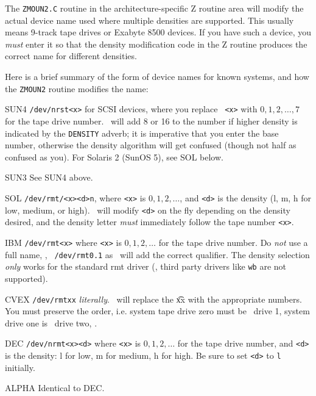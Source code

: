 The {\tt ZMOUN2.C} routine in the architecture-specific Z routine area will
modify the actual device name used where multiple densities are supported.
This usually means 9-track tape drives or Exabyte 8500 devices.  If you
have such a device, you {\it must\/} enter it so that the density
modification code in the Z routine produces the correct name for different
densities.

Here is a brief summary of the form of device names for known systems, and
how the {\tt ZMOUN2} routine modifies the name:
\medskip
{\parindent 2cm
\item{SUN4} {\tt /dev/nrst<x>} for SCSI devices, where you replace {\tt
            <x>} with $0, 1, 2, \dots, 7$ for the tape drive number.
            \AIPS\ will add 8 or 16 to the number if higher density is
            indicated by the {\tt DENSITY} adverb; it is imperative that
            you enter the base number, otherwise the density algorithm
            will get confused (though not half as confused as you).
            For Solaris 2 (SunOS 5), see SOL below.
\item{SUN3} See SUN4 above.
\item{SOL}  {\tt /dev/rmt/<x><d>n}, where {\tt <x>} is $0, 1, 2, \dots$,
            and {\tt <d>} is the density (l, m, h for low, medium, or
            high).  \AIPS\ will modify {\tt <d>} on the fly depending on
            the density desired, and the density letter {\it must\/}
            immediately follow the tape number {\tt <x>}.
\item{IBM}  {\tt /dev/rmt<x>} where {\tt <x>} is $0, 1, 2, \dots$ for
            the tape drive number.  Do {\it not\/} use a full name, \eg, {\tt
            /dev/rmt0.1} as \AIPS\ will add the correct qualifier.  The
            density selection {\it only\/} works for the standard rmt
            driver (\eg, third party drivers like {\tt wb} are not
            supported).
\item{CVEX} {\tt /dev/rmtxx} {\it literally\/}.  \AIPS\ will replace the
            {\t xx} with the appropriate numbers.  You must preserve the
            order, i.e. system tape drive zero must be \AIPS\ drive 1,
            system drive one is \AIPS\ drive two, \etc.
\item{DEC}  {\tt /dev/nrmt<x><d>} where {\tt <x>} is $0, 1, 2, \dots$
            for the tape drive number, and {\tt <d>} is the density: l
            for low, m for medium, h for high.  Be sure to set {\tt <d>}
            to {\tt l} initially.
\item{ALPHA} Identical to DEC.
}
